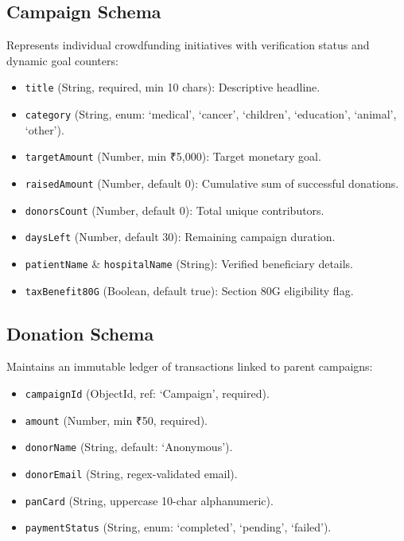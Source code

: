\documentclass[12pt,a4paper,oneside]{report}
\begin{document}
\subsection{Campaign Schema}
Represents individual crowdfunding initiatives with verification status and dynamic goal counters:
\begin{itemize}
    \item \texttt{title} (String, required, min 10 chars): Descriptive headline.
    \item \texttt{category} (String, enum: `medical', `cancer', `children', `education', `animal', `other').
    \item \texttt{targetAmount} (Number, min ₹5,000): Target monetary goal.
    \item \texttt{raisedAmount} (Number, default 0): Cumulative sum of successful donations.
    \item \texttt{donorsCount} (Number, default 0): Total unique contributors.
    \item \texttt{daysLeft} (Number, default 30): Remaining campaign duration.
    \item \texttt{patientName} \& \texttt{hospitalName} (String): Verified beneficiary details.
    \item \texttt{taxBenefit80G} (Boolean, default true): Section 80G eligibility flag.
\end{itemize}

\subsection{Donation Schema}
Maintains an immutable ledger of transactions linked to parent campaigns:
\begin{itemize}
    \item \texttt{campaignId} (ObjectId, ref: `Campaign', required).
    \item \texttt{amount} (Number, min ₹50, required).
    \item \texttt{donorName} (String, default: `Anonymous').
    \item \texttt{donorEmail} (String, regex-validated email).
    \item \texttt{panCard} (String, uppercase 10-char alphanumeric).
    \item \texttt{paymentStatus} (String, enum: `completed', `pending', `failed').
\end{itemize}

\end{document}
